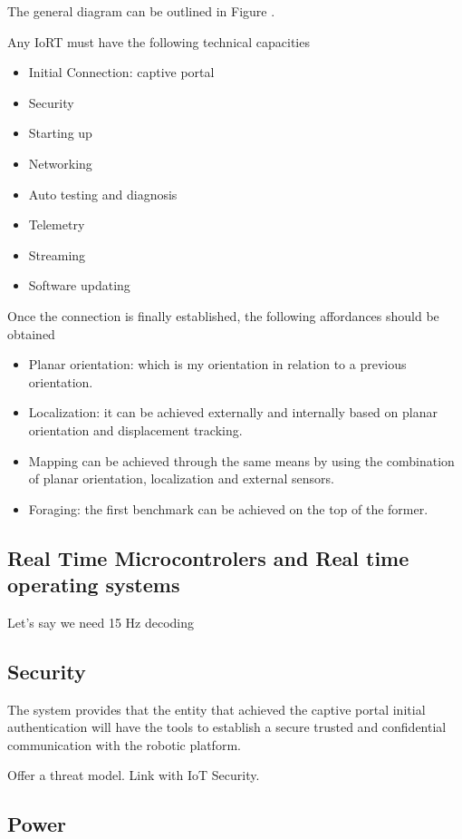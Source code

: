 The general diagram can be outlined in Figure .

Any IoRT must have the following technical capacities

\begin{itemize}
\item Initial Connection: captive portal
\item Security
\item Starting up
\item Networking
\item Auto testing and diagnosis
\item Telemetry
\item Streaming
\item Software updating
\end{itemize}

Once the connection is finally established, the following affordances should be obtained

\begin{itemize}
\item Planar orientation: which is my orientation in relation to a previous orientation.
\item Localization: it can be achieved externally and internally based on planar orientation and displacement tracking.
\item Mapping can be achieved through the same means by using the combination of planar orientation, localization and external sensors.
\item Foraging: the first benchmark can be achieved on the top of the former.
\end{itemize}

\subsection{Real Time Microcontrolers and Real time operating systems}

Let's say we need 15 Hz decoding 

\subsection{Security}

The system provides that the entity that achieved the captive portal initial authentication will have the tools to establish a secure trusted and confidential communication with the robotic platform.

Offer a threat model.  Link with IoT Security.

\subsection{Power}


